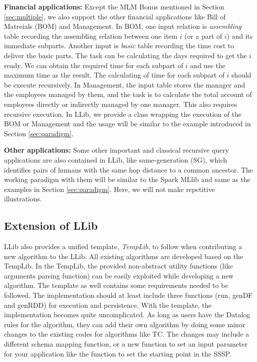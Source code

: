 \textbf{Financial   applications:}
Except the MLM Bonus mentioned in Section \ref{sec:multiple}, we also support the other financial applications like Bill of Matreials (BOM) \citep{BOM} and  Management. In BOM, one input relation is \textit{assembling} table recording the assembling relation between one item $i$ (or a part of $i$) and its immediate subparts. Another input is \textit{basic} table recording the time cost to deliver the basic parts. The task can be calculating the days required to get  the $i$ ready. We can obtain the required time for each subpart of $i$ and use the maximum time as the result. The calculating of time for each subpart of $i$ should be  execute recursively. In Management, the input table stores the manager and the employees managed by them, and the task is to calculate the total account of employees directly or indirectly managed by one manager. This also requires recursive execution. In LLib, we provide a class wrapping the execution of the BOM or Management and the usage will be similar to the example introduced in Section \ref{sec:paradigm}.

\textbf{Other applications:}
Some other important and classical recursive query applications are also contained in LLib, like same-generation (SG), which identifies pairs of humans with the same hop distance to a common ancestor.  The working paradigm with them will be similar to the Spark MLlib and same as the examples in Section \ref{sec:paradigm}. Here, we will not make repetitive illustrations.

\subsection{Extension of LLib}
LLib also provides a unified template, \textit{TempLib}, to follow when contributing a new algorithm to the LLib. All existing algorithms are developed based on the TempLib. In the TempLib, the provided non-abstract utility functions (like arguments parsing function) can be easily exploited while developing a new algorithm. The template as well contains some requirements needed to be followed. The implementation should at least include three functions (run, genDF and genRDD) for execution and persistence. With the template, the implementation becomes quite uncomplicated. As long as users have the Datalog rules for the algorithm, they can add their own algorithm by doing some minor changes to the existing codes for algorithms like TC. The changes may include a different schema mapping function, or a new function to set an input parameter for your application like the function to set the starting point in the SSSP. 

